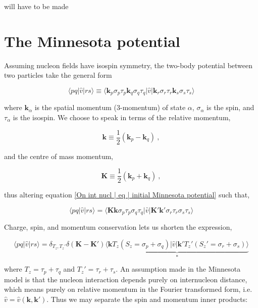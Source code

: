 \documentclass[10pt]{report}
\begin{document}
	will have to be made
	
	\section{The Minnesota potential}
	Assuming nucleon fields have isospin symmetry, the two-body potential between two particles take the general form
	
	\begin{equation}
		\langle pq|\hat{v}|rs\rangle \equiv \langle \bm{k}_p\sigma_p\tau_p\bm{k}_q\sigma_q\tau_q |\hat{v}| \bm{k}_r\sigma_r\tau_r\bm{k}_s\sigma_s\tau_s\rangle
		\label{On int nucl | eq | initial Minnesota potential}
	\end{equation}
	
	where $\bm{k}_\alpha$ is the spatial momentum (3-momentum) of state $\alpha$, $\sigma_\alpha$ is the spin, and $\tau_\alpha$ is the isospin. We choose to speak in terms of the relative momentum,
	
	\begin{equation}
		\bm{k} \equiv \frac{1}{2}(\bm{k}_p - \bm{k}_q)\:,
	\end{equation}
	
	and the centre of mass momentum,
	
	\begin{equation}
		\bm{K} \equiv \frac{1}{2}(\bm{k}_p + \bm{k}_q)\:,
	\end{equation}
	
	thus altering equation \ref{On int nucl | eq | initial Minnesota potential} such that,
	
	\begin{equation}
		\langle pq|\hat{v}|rs\rangle = \langle \bm{K}\bm{k}\sigma_p\tau_p\sigma_q\tau_q |\hat{v}| \bm{K}'\bm{k}'\sigma_r\tau_r\sigma_s\tau_s\rangle
	\end{equation}
	
	Charge, spin, and momentum conservation lets us shorten the expression,
	
	\begin{equation}
		\langle pq|\hat{v}|rs\rangle = \delta_{T_z,T_z'}\delta(\bm{K}-\bm{K}')\underbrace{\langle \bm{k}T_z(S_z=\sigma_p+\sigma_q) |\hat{v}| \bm{k}'T_z'(S_z'=\sigma_r+\sigma_s)\rangle}_{\ast}
	\end{equation}
	
	where $T_z=\tau_p+\tau_q$ and $T_z'=\tau_r+\tau_s$. An assumption made in the Minnesota model is that the nucleon interaction depends purely on internucleon distance, which means purely on relative momentum in the Fourier transformed form, i.e. $\hat{v} = \hat{v}(\bm{k},\bm{k}')$. Thus we may separate the spin and momentum inner products:
	
\end{document}
